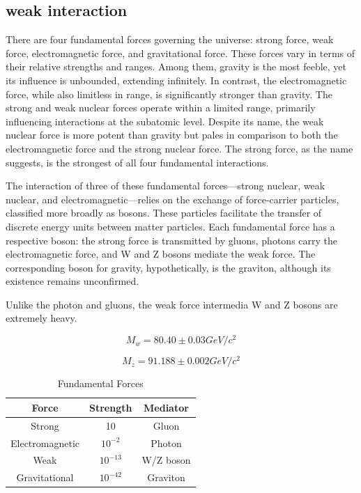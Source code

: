 \subsection{weak interaction}

There are four fundamental forces governing the universe: strong force, weak force, electromagnetic force, and gravitational force. These forces vary in terms of their relative strengths and ranges. Among them, gravity is the most feeble, yet its influence is unbounded, extending infinitely. In contrast, the electromagnetic force, while also limitless in range, is significantly stronger than gravity. The strong and weak nuclear forces operate within a limited range, primarily influencing interactions at the subatomic level. Despite its name, the weak nuclear force is more potent than gravity but pales in comparison to both the electromagnetic force and the strong nuclear force. The strong force, as the name suggests, is the strongest of all four fundamental interactions.

The interaction of three of these fundamental forces—strong nuclear, weak nuclear, and electromagnetic—relies on the exchange of force-carrier particles, classified more broadly as bosons. These particles facilitate the transfer of discrete energy units between matter particles. Each fundamental force has a respective boson: the strong force is transmitted by gluons, photons carry the electromagnetic force, and W and Z bosons mediate the weak force. The corresponding boson for gravity, hypothetically, is the graviton, although its existence remains unconfirmed.

Unlike the photon and gluons, the weak force intermedia W and Z bosons are extremely heavy. 

\begin{equation}
    M_w = 80.40 \pm 0.03 GeV/c^2
\end{equation}

\begin{equation}
    M_z = 91.188 \pm 0.002 GeV/c^2
\end{equation}

\begin{table}[!h]
    \centering
    \begin{tabular}{c |c | c}
         Force  & Strength & Mediator \\ \hline
         Strong & 10  & Gluon \\ \hline
         Electromagnetic & $10^{-2}$ &  Photon \\ \hline
         Weak & $10^{-13}$ & W/Z boson \\ \hline
         Gravitational & $10^{-42}$ & Graviton \\ \hline
    \end{tabular}
    \caption{Fundamental Forces}
    \label{tab:my_label}
\end{table}


